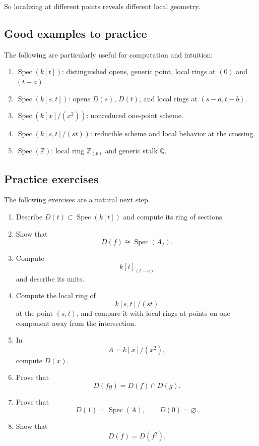 \documentclass[12pt,a4paper]{article}
\theoremstyle{notespace}
\newcommand{\Spec}{\operatorname{Spec}}
\theoremstyle{definition}
\begin{document}
So localizing at different points reveals different local geometry.

\subsection{Good examples to practice}

The following are particularly useful for computation and intuition:

\begin{enumerate}[leftmargin=2em]
	\item \(\Spec(k[t])\): distinguished opens, generic point, local rings at \((0)\) and \((t-a)\).
	\item \(\Spec(k[s,t])\): opens \(D(s)\), \(D(t)\), and local rings at \((s-a,t-b)\).
	\item \(\Spec(k[x]/(x^2))\): nonreduced one-point scheme.
	\item \(\Spec(k[s,t]/(st))\): reducible scheme and local behavior at the crossing.
	\item \(\Spec(\mathbb Z)\): local ring \(\mathbb Z_{(p)}\) and generic stalk \(\mathbb Q\).
\end{enumerate}

\subsection{Practice exercises}

The following exercises are a natural next step.

\begin{enumerate}[leftmargin=2em]
	\item Describe \(D(t)\subset \Spec(k[t])\) and compute its ring of sections.
	\item Show that
	\[
	D(f)\cong \Spec(A_f).
	\]
	\item Compute
	\[
	k[t]_{(t-a)}
	\]
	and describe its units.
	\item Compute the local ring of
	\[
	k[s,t]/(st)
	\]
	at the point \((s,t)\), and compare it with local rings at points on one component away from the intersection.
	\item In
	\[
	A=k[x]/(x^2),
	\]
	compute \(D(\overline{x})\).
	\item Prove that
	\[
	D(fg)=D(f)\cap D(g).
	\]
	\item Prove that
	\[
	D(1)=\Spec(A),\qquad D(0)=\varnothing.
	\]
	\item Show that
	\[
	D(f)=D(f^2).
	\]
\end{enumerate}
\end{document}
